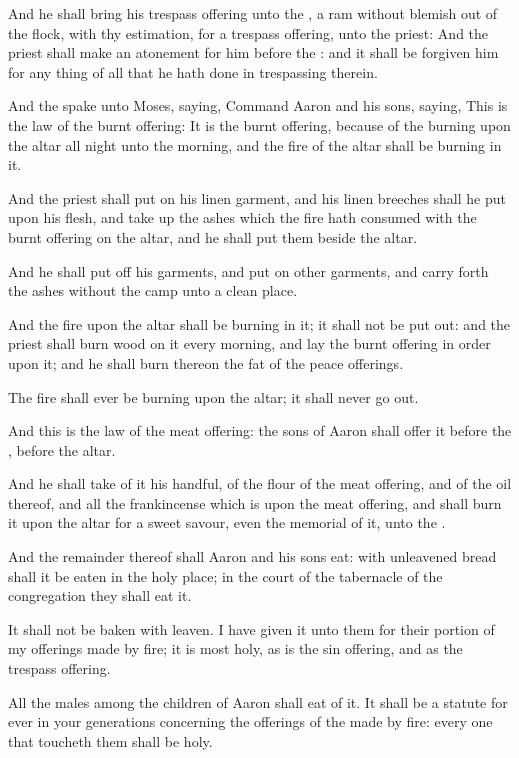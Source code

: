 \Verse And he shall bring his trespass offering unto the \LORD, a ram without blemish out of the flock, with thy estimation, for a trespass offering, unto the priest: \Verse And the priest shall make an atonement for him before the \LORD: and it shall be forgiven him for any thing of all that he hath done in trespassing therein.

\Verse And the \LORD spake unto Moses, saying, \Verse Command Aaron and his sons, saying, This is the law of the burnt offering: It is the burnt offering, because of the burning upon the altar all night unto the morning, and the fire of the altar shall be burning in it.

\Verse And the priest shall put on his linen garment, and his linen breeches shall he put upon his flesh, and take up the ashes which the fire hath consumed with the burnt offering on the altar, and he shall put them beside the altar.

\Verse And he shall put off his garments, and put on other garments, and carry forth the ashes without the camp unto a clean place.

\Verse And the fire upon the altar shall be burning in it; it shall not be put out: and the priest shall burn wood on it every morning, and lay the burnt offering in order upon it; and he shall burn thereon the fat of the peace offerings.

\Verse The fire shall ever be burning upon the altar; it shall never go out.

\Verse And this is the law of the meat offering: the sons of Aaron shall offer it before the \LORD, before the altar.

\Verse And he shall take of it his handful, of the flour of the meat offering, and of the oil thereof, and all the frankincense which is upon the meat offering, and shall burn it upon the altar for a sweet savour, even the memorial of it, unto the \LORD.

\Verse And the remainder thereof shall Aaron and his sons eat: with unleavened bread shall it be eaten in the holy place; in the court of the tabernacle of the congregation they shall eat it.

\Verse It shall not be baken with leaven. I have given it unto them for their portion of my offerings made by fire; it is most holy, as is the sin offering, and as the trespass offering.

\Verse All the males among the children of Aaron shall eat of it. It shall be a statute for ever in your generations concerning the offerings of the \LORD made by fire: every one that toucheth them shall be holy.

